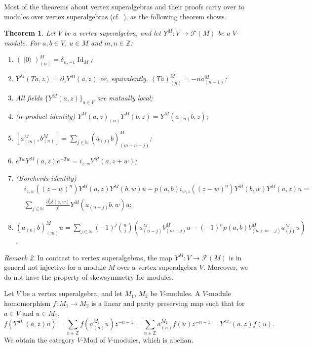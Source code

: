 \documentclass[a4paper, 12pt, reqno]{amsart}
\newtheorem{theorem}{Theorem}[section]
\theoremstyle{remark}
\newtheorem{remark}[theorem]{Remark}
\DeclareMathOperator{\Id}{Id}
\DeclareMathOperator{\vac}{|0\rangle}
\begin{document}
Most of the theorems about vertex superalgebras and their proofs carry over to modules over vertex superalgebras (cf.\ ), as the following theorem shows.

\begin{theorem}
  \label{thr:24}
  Let $V$ be a vertex superalgebra, and let $Y^M: V \to \mathcal{F}(M)$ be a $V$-module.
  For $a, b \in V$, $u \in M$ and $m, n \in \mathbb{Z}$:
  \begin{enumerate}
  \item $(\vac)^M_{(n)} = \delta_{n, -1}\Id_M$;
  \item $Y^M(Ta, z) = \partial_zY^M(a, z)$ or, equivalently, $(Ta)^M_{(n)} = -na^M_{(n - 1)}$;
  \item All fields $\{Y^M(a, z)\}_{a \in V}$ are mutually local;
  \item \emph{($n$-product identity)} $Y^M(a, z)_{(n)}Y^M(b, z) = Y^M(a_{(n)}b, z)$;
  \item $[a^M_{(m)}, b^M_{(n)}] = \sum_{j \in \mathbb{N}}(a_{(j)}b)^M_{(m + n - j)}$;
  \item $e^{Tw}Y^M(a, z)e^{-Tw} = i_{z, w}Y^M(a, z + w)$;
  \item \emph{(Borcherds identity)}
    \begin{equation*}
      \begin{split}
        &i_{z, w}((z - w)^n)Y^M(a, z)Y^M(b, w)u - p(a, b)i_{w, z}((z - w)^n)Y^M(b, w)Y^M(a, z)u = \\
        &\sum_{j \in \mathbb{N}}\frac{\partial^j_w\delta(z, w)}{j!}Y^M(a_{(n + j)}b, w)u;
      \end{split}
    \end{equation*}
  \item $(a_{(n)}b)^M_{(m)}u = \sum_{j \in \mathbb{N}}(-1)^j\binom{n}{j}(a^M_{(n - j)}b^M_{(m + j)}u - (-1)^np(a, b)b^M_{(n + m - j)}a^M_{(j)}u)$.
  \end{enumerate}
\end{theorem}

\begin{remark}
  \label{rmk:22}
  In contrast to vertex superalgebras, the map $Y^M: V \to \mathcal{F}(M)$ is in general not injective for a module $M$ over a vertex superalgebra $V$.
  Moreover, we do not have the property of skewsymmetry for modules.
\end{remark}

Let $V$ be a vertex superalgebra, and let $M_1$, $M_2$ be $V$-modules.
A $V$-module homomorphism $f: M_1 \to M_2$ is a linear and parity preserving map such that for $a \in V$ and $u \in M_1$,
\begin{equation*}
  f(Y^{M_1}(a, z)u) = \sum_{n \in \mathbb{Z}}f(a^{M_1}_{(n)}u)z^{-n - 1} = \sum_{n \in \mathbb{Z}}a^{M_2}_{(n)}f(u)z^{-n - 1} = Y^{M_2}(a, z)f(u).
\end{equation*}
We obtain the category $V$-Mod of $V$-modules, which is abelian.
\end{document}
